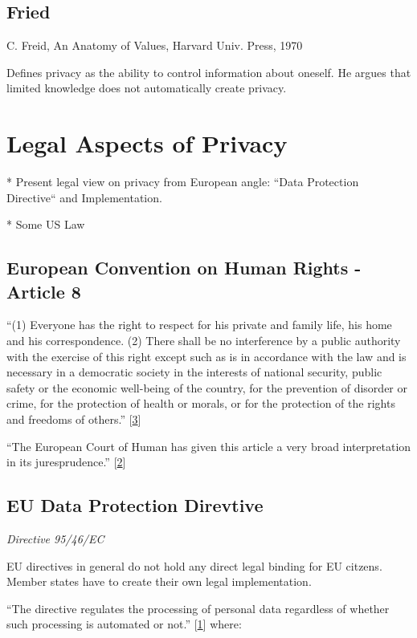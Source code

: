 \subsection{Fried}

C. Freid, An Anatomy of Values, Harvard Univ. Press, 1970

Defines privacy as the ability to control information about oneself. He argues that limited knowledge does not automatically create privacy.

\section{Legal Aspects of Privacy}

* Present legal view on privacy from European angle: ``Data Protection Directive`` and Implementation.

* Some US Law

\subsection{European Convention on Human Rights - Article 8}

``(1) Everyone has the right to respect for his private and family life, his home and his correspondence. (2) There shall be no interference by a public authority with the exercise of this right except such as is in accordance with the law and is necessary in a democratic society in the interests of national security, public safety or the economic well-being of the country, for the prevention of disorder or crime, for the protection of health or morals, or for the protection of the rights and freedoms of others.'' {[}\hyperref[references]{3}{]}

``The European Court of Human has given this article a very broad
interpretation in its juresprudence.'' {[}\hyperref[references]{2}{]}

\subsection{EU Data Protection Direvtive}

\emph{Directive 95/46/EC}

EU directives in general do not hold any direct legal binding for EU citzens.
Member states have to create their own legal implementation.

``The directive regulates the processing of personal data regardless of whether such processing is automated or not.''
{[}\hyperref[references]{1}{]} where:

